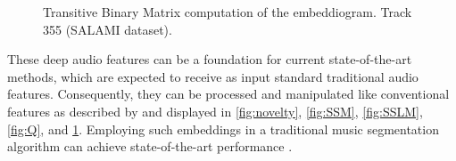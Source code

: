 \begin{figure}[ht]
\begin{minipage}{0.45\textwidth}
        \caption[Track 355 (SALAMI dataset). Transitive Binary Similarity Matrix]{Transitive Binary Matrix computation of the embeddiogram. Track 355 (SALAMI dataset).}
        \label{fig:TBSM}
    \end{minipage}
\end{figure}


These deep audio features can be a foundation for current state-of-the-art methods, which are expected to receive as input standard traditional audio features. Consequently, they can be processed and manipulated like conventional features as described by \cite{unsuperMSA} and displayed in \ref{fig:novelty}, \ref{fig:SSM}, \ref{fig:SSLM}, \ref{fig:Q}, and \ref{fig:TBSM}. Employing such embeddings in a traditional music segmentation algorithm can achieve state-of-the-art performance \cite{deepfeaturesegment}.

\newpage